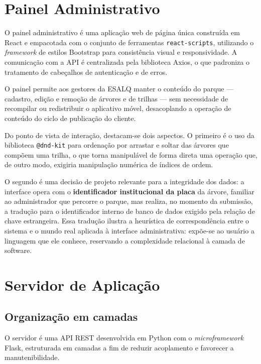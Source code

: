 \section{Painel Administrativo}
\label{sec:painel}

O painel administrativo é uma aplicação web de página única construída em React e
empacotada com o conjunto de ferramentas \texttt{react-scripts}, utilizando o
\textit{framework} de estilos Bootstrap para consistência visual e
responsividade. A comunicação com a API é centralizada pela biblioteca Axios, o
que padroniza o tratamento de cabeçalhos de autenticação e de erros.

O painel permite aos gestores da ESALQ manter o conteúdo do parque --- cadastro,
edição e remoção de árvores e de trilhas --- sem necessidade de recompilar ou
redistribuir o aplicativo móvel, desacoplando a operação de conteúdo do ciclo de
publicação do cliente.

Do ponto de vista de interação, destacam-se dois aspectos. O primeiro é o uso da
biblioteca \texttt{@dnd-kit} para ordenação por arrastar e soltar das árvores que
compõem uma trilha, o que torna manipulável de forma direta uma operação que, de
outro modo, exigiria manipulação numérica de índices de ordem.

O segundo é uma decisão de projeto relevante para a integridade dos dados: a
interface opera com o \textbf{identificador institucional da placa} da árvore,
familiar ao administrador que percorre o parque, mas realiza, no momento da
submissão, a tradução para o identificador interno de banco de dados exigido pela
relação de chave estrangeira. Essa tradução ilustra a heurística de
correspondência entre o sistema e o mundo real aplicada à interface
administrativa: expõe-se ao usuário a linguagem que ele conhece, reservando a
complexidade relacional à camada de software.

\section{Servidor de Aplicação}
\label{sec:backend}

\subsection{Organização em camadas}

O servidor é uma API REST desenvolvida em Python com o \textit{microframework}
Flask, estruturada em camadas a fim de reduzir acoplamento e favorecer a
manutenibilidade.

